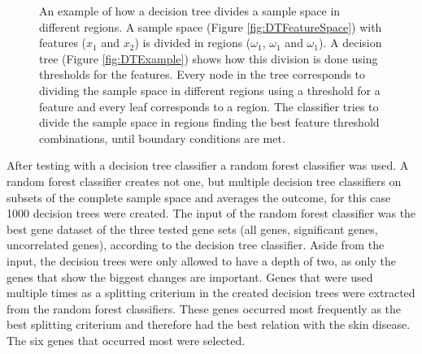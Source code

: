 \documentclass[10pt,a4paper]{article}
\begin{document}
		\begin{figure}[H]
		\centering
		\hfill
		\caption{An example of how a decision tree divides a sample space in different regions. A sample space (Figure \ref{fig:DTFeatureSpace}) with features ($x_1$ and $x_2$) is divided in regions ($\omega_1$, $\omega_1$ and $\omega_1$). A decision tree (Figure \ref{fig:DTExample}) shows how this division is done using thresholds for the features. Every node in the tree corresponds to dividing the sample space in different regions using a threshold for a feature and every leaf corresponds to a region. The classifier tries to divide the sample space in regions finding the best feature threshold combinations, until boundary conditions are met.}
		\label{fig:DecisionTree}
	\end{figure}
	
	After testing with a decision tree classifier a random forest classifier was used. A random forest classifier creates not one, but multiple decision tree classifiers on subsets of the complete sample space and averages the outcome, for this case 1000 decision trees were created. The input of the random forest classifier was the best gene dataset of the three tested gene sets (all genes, significant genes, uncorrelated genes), according to the decision tree classifier. Aside from the input, the decision trees were only allowed to have a depth of two, as only the genes that show the biggest changes are important. Genes that were used multiple times as a splitting criterium in the created decision trees were extracted from the random forest classifiers. These genes occurred most frequently as the best splitting criterium and therefore had the best relation with the skin disease. The six genes that occurred most were selected.
	
\end{document}

